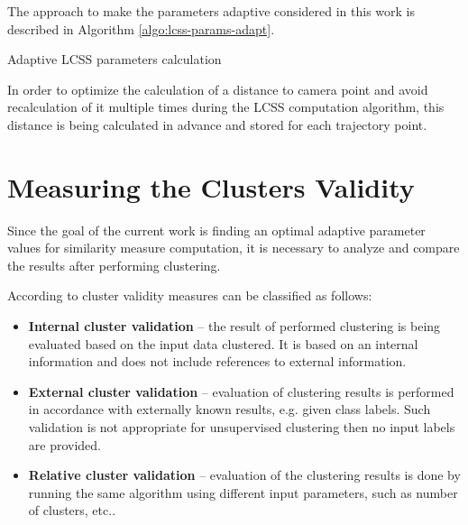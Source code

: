 The approach to make the parameters adaptive considered in this work is described in Algorithm \ref{algo:lcss-params-adapt}.

\begin{algorithm}[!htb]
	\caption{Adaptive LCSS parameters calculation}
	\label{algo:lcss-params-adapt}
	\SetAlgoLined
\end{algorithm}

In order to optimize the calculation of a distance to camera point and avoid recalculation of it multiple times during the LCSS computation algorithm, this distance is being calculated in advance and stored for each trajectory point.

\section{Measuring the Clusters Validity}

Since the goal of the current work is finding an optimal adaptive parameter values for similarity measure computation, it is necessary to analyze and compare the results after performing clustering. 

According to \cite{online:dunn_cl_valid} cluster validity measures can be classified as follows:
\begin{itemize}
	\item \textbf{Internal cluster validation} -- the result of performed clustering is being evaluated based on the input data clustered. It is based on an internal information and does not include references to external information.
	\item \textbf{External cluster validation} -- evaluation of clustering results is performed in accordance with externally known results, e.g. given class labels. Such validation is not appropriate for unsupervised clustering then no input labels are provided.
	\item \textbf{Relative cluster validation} -- evaluation of the clustering results is done by running the same algorithm using different input parameters, such as number of clusters, etc..
\end{itemize}

